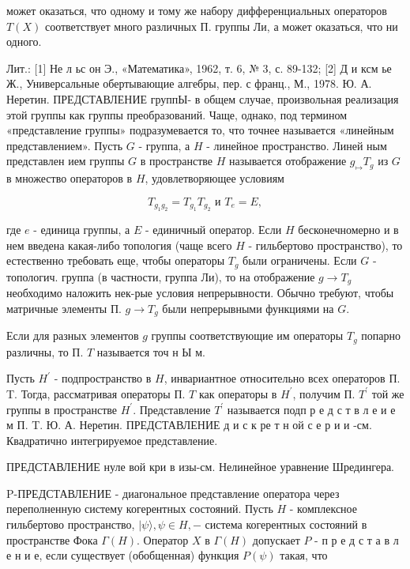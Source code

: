 \documentclass[10pt]{article}
\begin{document}
может оказаться, что одному и тому же набору дифференциальных операторов $T(X)$ соответствует много различных П. группы Ли, а может оказаться, что ни одного.



Лит.: [1] Не л ьс он Э., «Математика», 1962, т. 6, № 3, с. 89-132; [2] Д и ксм ье Ж., Универсальные обертывающие алгебры, пер. с франц., М., 1978. Ю. А. Неретин. ПРЕДСТАВЛЕНИЕ группЫ- в общем случае, произвольная реализация этой группы как группы преобразований. Чаще, однако, под термином «представление группы» подразумевается то, что точнее называется «линейным представлением». Пусть $G$ - группа, а $H$ - линейное пространство. Линей ным представлен ием группы $G$ в пространстве $H$ называется отображение $g_{\mapsto} T_{g}$ из $G$ в множество операторов в $H$, удовлетворяющее условиям



\[

T_{g_{1} g_{2}}=T_{g_{1}} T_{g_{2}} \text { и } T_{e}=E,

\]



где $e$ - единица группы, а $E$ - единичный оператор. Если $H$ бесконечномерно и в нем введена какая-либо топология (чаще всего $H$ - гильбертово пространство), то естественно требовать еще, чтобы операторы $T_{g}$ были ограничены. Если $G$ - топологич. группа (в частности, группа Ли), то на отображение $g \rightarrow T_{g}$ необходимо наложить нек-рые условия непрерывности. Обычно требуют, чтобы матричные элементы П. $g \rightarrow T_{g}$ были непрерывными функциями на $G$.



Если для разных элементов $g$ группы соответствующие им операторы $T_{g}$ попарно различны, то П. $T$ называется точ н Ы м.



Пусть $H^{\prime}$ - подпространство в $H$, инвариантное относительно всех операторов П. T. Тогда, рассматривая операторы П. $T$ как операторы в $H^{\prime}$, получим П. $T^{\prime}$ той же группы в пространстве $H^{\prime}$. Представление $T^{\prime}$ называется подп р е д с т в л е и е м П. T. Ю. А. Неретин. ПРЕДСТАВЛЕНИЕ д и с к ре т н ой с е р и и -см. Квадратично интегрируемое представление.



ПРЕДСТАВЛЕНИЕ нуле вой кри в изы-см. Нелинейное уравнение Шредингера.



P-ПРЕДСТАВЛЕНИЕ - диагональное представление оператора через переполненную систему когерентных состояний. Пусть $H$ - комплексное гильбертово пространство, $|\psi\rangle, \psi \in H,-$ система когерентных состояний в пространстве Фока $\Gamma(H)$. Оператор $X$ в $\Gamma(H)$ допускает $P$ - п р е д с т а в л е н и е, если существует (обобщенная) функция $P(\psi)$ такая, что
\end{document}
